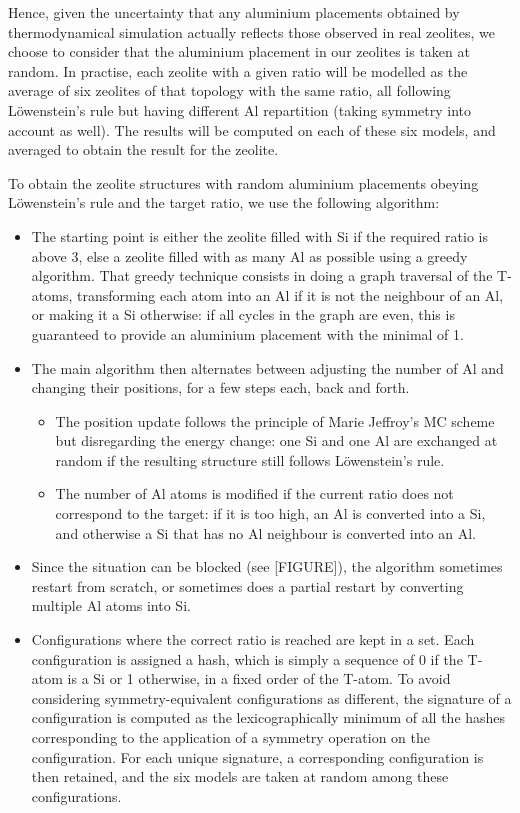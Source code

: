 \documentclass[main.tex]{subfiles}
\begin{document}
Hence, given the uncertainty that any aluminium placements obtained by thermodynamical simulation actually reflects those observed in real zeolites, we choose to consider that the aluminium placement in our zeolites is taken at random. In practise, each zeolite with a given \SiAl ratio will be modelled as the average of six zeolites of that topology with the same \SiAl ratio, all following L\"owenstein's rule but having different Al repartition (taking symmetry into account as well). The results will be computed on each of these six models, and averaged to obtain the result for the zeolite.

To obtain the zeolite structures with random aluminium placements obeying L\"owenstein's rule and the target \SiAl ratio, we use the following algorithm:
\begin{itemize}
    \item The starting point is either the zeolite filled with Si if the required \SiAl ratio is above 3, else a zeolite filled with as many Al as possible using a greedy algorithm. That greedy technique consists in doing a graph traversal of the T-atoms, transforming each atom into an Al if it is not the neighbour of an Al, or making it a Si otherwise: if all cycles in the graph are even, this is guaranteed to provide an aluminium placement with the minimal \SiAl of 1.
    \item The main algorithm then alternates between adjusting the number of Al and changing their positions, for a few steps each, back and forth.
    \begin{itemize}
        \item The position update follows the principle of Marie Jeffroy's MC scheme but disregarding the energy change: one Si and one Al are exchanged at random if the resulting structure still follows L\"owenstein's rule.
        \item The number of Al atoms is modified if the current \SiAl ratio does not correspond to the target: if it is too high, an Al is converted into a Si, and otherwise a Si that has no Al neighbour is converted into an Al.
    \end{itemize}
    \item Since the situation can be blocked (see [FIGURE]), the algorithm sometimes restart from scratch, or sometimes does a partial restart by converting multiple Al atoms into Si.
    \item Configurations where the correct \SiAl ratio is reached are kept in a set. Each configuration is assigned a hash, which is simply a sequence of 0 if the T-atom is a Si or 1 otherwise, in a fixed order of the T-atom. To avoid considering symmetry-equivalent configurations as different, the signature of a configuration is computed as the lexicographically minimum of all the hashes corresponding to the application of a symmetry operation on the configuration. For each unique signature, a corresponding configuration is then retained, and the six models are taken at random among these configurations.
\end{itemize}
\end{document}
